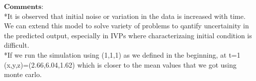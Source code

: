 \documentclass[11pt]{article}
\begin{document}
$\textbf{Comments}$: 
\\*It is observed that initial noise or variation in the data is increased with time. We can extend this model to solve variety of problems to qantify uncertainity in the predicted output, especially in IVPs where characterizaing initial condition is difficult.
\\*If we run the simulation using (1,1,1) as we defined in the beginning, at t=1 (x,y,z)=(2.66,6.04,1.62) which is closer to the mean values that we got using monte carlo.
\end{document}
